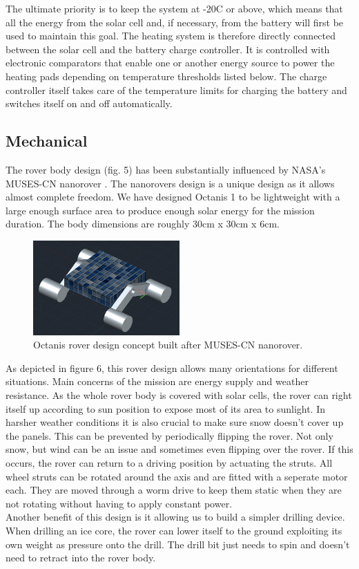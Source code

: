 \documentclass[a4paper,12pt]{article}
\begin{document}
The ultimate priority is to keep the system at -20\degree C or above, which means that all the energy from the solar cell and, if necessary, from the battery will first be used to maintain this goal. The heating system is therefore directly connected between the solar cell and the battery charge controller. It is controlled with electronic comparators that enable one or another energy source to power the heating pads depending on temperature thresholds listed below. The charge controller itself takes care of the temperature limits for charging the battery and switches itself on and off automatically. 


\subsection{Mechanical}
The rover body design (fig. 5) has been substantially influenced by NASA's MUSES-CN nanorover \cite{muses}. The nanorovers design is a unique design as it allows almost complete freedom. We have designed Octanis 1 to be lightweight with a large enough surface area to produce enough solar energy for the mission duration. The body dimensions are roughly 30cm x 30cm x 6cm.

\begin{figure}[h!]
	\centering
    \includegraphics[width=0.5\textwidth]{conceptrover}
    \caption{Octanis rover design concept built after MUSES-CN nanorover.}
\end{figure}

As depicted in figure 6, this rover design allows many orientations for different situations. Main concerns of the mission are energy supply and weather resistance. As the whole rover body is covered with solar cells, the rover can right itself up according to sun position to expose most of its area to sunlight. In harsher weather conditions it is also crucial to make sure snow doesn't cover up the panels. This can be prevented by periodically flipping the rover. Not only snow, but wind can be an issue and sometimes even flipping over the rover. If this occurs, the rover can return to a driving position by actuating the struts. All wheel struts can be rotated around the axis and are fitted with a seperate motor each. They are moved through a worm drive to keep them static when they are not rotating without having to apply constant power. \\
Another benefit of this design is it allowing us to build a simpler drilling device. When drilling an ice core, the rover can lower itself to the ground exploiting its own weight as pressure onto the drill. The drill bit just needs to spin and doesn't need to retract into the rover body.
\end{document}
